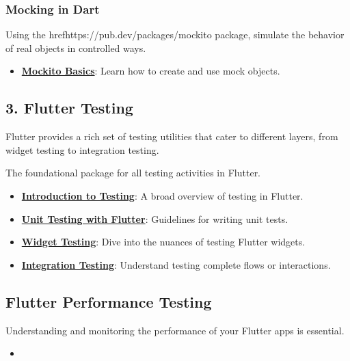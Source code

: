 \subsubsection*{Mocking in Dart}

Using the href{https://pub.dev/packages/mockito}{} package, simulate the behavior of real objects in controlled ways.
\begin{itemize}
 \item \href{https://pub.dev/packages/mockito}{\textbf{Mockito Basics}}: Learn how to create and use mock objects.
\end{itemize}

\subsection*{3. Flutter Testing}

Flutter provides a rich set of testing utilities that cater to different layers, from widget testing to integration testing.


The foundational package for all testing activities in Flutter.

\begin{itemize}
 \item \href{https://docs.flutter.dev/testing}{\textbf{Introduction to Testing}}: A broad overview of testing in Flutter.
 \item \href{https://docs.flutter.dev/cookbook/testing/unit/introduction}{\textbf{Unit Testing with Flutter}}: Guidelines for writing unit tests.
 \item \href{https://docs.flutter.dev/cookbook/testing/widget/introduction}{\textbf{Widget Testing}}: Dive into the nuances of testing Flutter widgets.
 \item \href{https://docs.flutter.dev/cookbook/testing/integration/introduction}{\textbf{Integration Testing}}: Understand testing complete flows or interactions.
\end{itemize}

\subsection*{Flutter Performance Testing}

Understanding and monitoring the performance of your Flutter apps is essential.

\begin{itemize}
 \item {}
\end{itemize}

